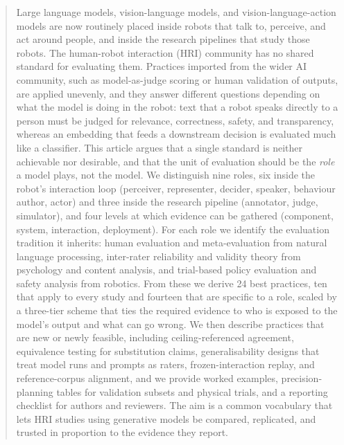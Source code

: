 \begin{abstract}
Large language models, vision-language models, and vision-language-action
models are now routinely placed inside robots that talk to, perceive, and act
around people, and inside the research pipelines that study those robots. The
human-robot interaction (HRI) community has no shared standard for evaluating
them. Practices imported from the wider AI community, such as model-as-judge
scoring or human validation of outputs, are applied unevenly, and they answer
different questions depending on what the model is doing in the robot: text
that a robot speaks directly to a person must be judged for relevance,
correctness, safety, and transparency, whereas an embedding that feeds a
downstream decision is evaluated much like a classifier. This article argues
that a single standard is neither achievable nor desirable, and that the unit
of evaluation should be the \emph{role} a model plays, not the model. We
distinguish nine roles, six inside the robot's interaction loop (perceiver,
representer, decider, speaker, behaviour author, actor) and three inside the
research pipeline (annotator, judge, simulator), and four levels at which
evidence can be gathered (component, system, interaction, deployment). For
each role we identify the evaluation tradition it inherits: human evaluation
and meta-evaluation from natural language processing, inter-rater reliability
and validity theory from psychology and content analysis, and trial-based
policy evaluation and safety analysis from robotics. From these we derive 24
best practices, ten that apply to every study and fourteen that are specific
to a role, scaled by a three-tier scheme that ties the required evidence to
who is exposed to the model's output and what can go wrong. We then describe
practices that are new or newly feasible, including ceiling-referenced
agreement, equivalence testing for substitution claims, generalisability
designs that treat model runs and prompts as raters, frozen-interaction
replay, and reference-corpus alignment, and we provide worked examples,
precision-planning tables for validation subsets and physical trials, and a
reporting checklist for authors and reviewers. The aim is a common vocabulary
that lets HRI studies using generative models be compared, replicated, and
trusted in proportion to the evidence they report.
\end{abstract}
